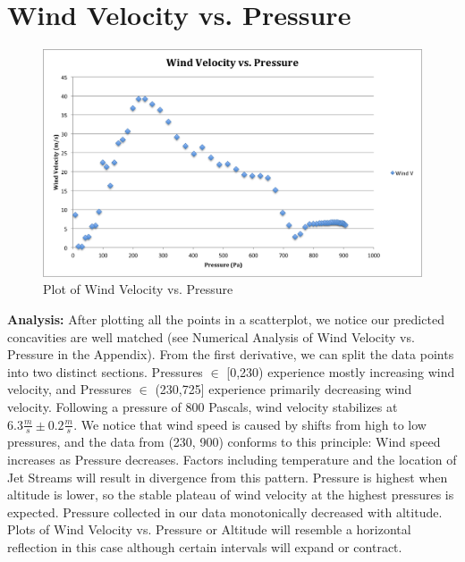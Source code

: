 \documentclass{article}
\begin{document}
\part{Wind Velocity vs. Pressure}
\label{george}


\begin{figure}[H]
\centering
\includegraphics[width=\textwidth]{IMG1CDATA.png}
\caption{Plot of Wind Velocity vs. Pressure}
\end{figure}

\begin{flushleft}
\textbf{Analysis:} After plotting all the points in a scatterplot, we notice our predicted concavities are well matched (see Numerical Analysis of Wind Velocity vs. Pressure in the Appendix).  From the first derivative, we can split the data points into two distinct sections.  Pressures $\in$ [0,230) experience mostly increasing wind velocity, and Pressures $\in$ (230,725] experience primarily decreasing wind velocity.  Following a pressure of 800 Pascals, wind velocity stabilizes at $6.3\frac{m}{s} \pm 0.2\frac{m}{s}$.  We notice that wind speed is caused by shifts from high to low pressures, and the data from (230, 900) conforms to this principle: Wind speed increases as Pressure decreases.  Factors including temperature and the location of Jet Streams will result in divergence from this pattern.  Pressure is highest when altitude is lower, so the stable plateau of wind velocity at the highest pressures is expected.  Pressure collected in our data monotonically decreased with altitude.  Plots of Wind Velocity vs. Pressure or Altitude will resemble a horizontal reflection in this case although certain intervals will expand or contract.
\end{flushleft}
\end{document}
